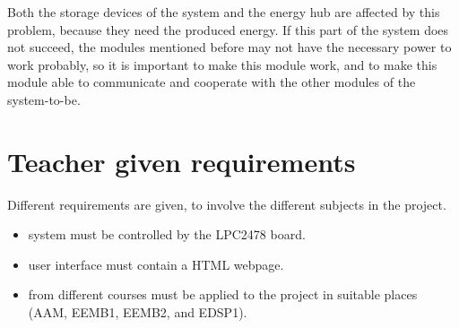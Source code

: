 Both the storage devices of the system and the energy hub are affected by this problem, because they need the produced energy. If this part of the system does not succeed, the modules mentioned before may not have the necessary power to work probably, so it is important to make this module work, and to make this module able to communicate and cooperate with the other modules of the system-to-be.

\section{Teacher given requirements}

Different requirements are given, to involve the different subjects in the project.

\begin{itemize}
\item system must be controlled by the LPC2478 board.
\item user interface must contain a HTML webpage.
\item from different courses must be applied to the project in suitable places (AAM, EEMB1, EEMB2, and EDSP1).
\end{itemize}